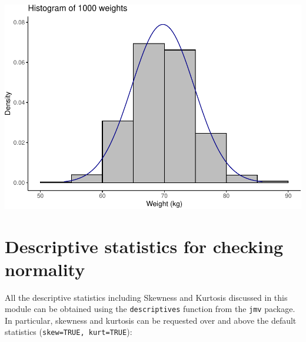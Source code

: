 \documentclass[
]{memoir}
\begin{document}
\includegraphics{02.1-Probability_files/figure-latex/unnamed-chunk-7-1.pdf}

\hypertarget{descriptive-statistics-for-checking-normality}{%
\section{Descriptive statistics for checking normality}\label{descriptive-statistics-for-checking-normality}}

All the descriptive statistics including Skewness and Kurtosis discussed in this module can be obtained using the \texttt{descriptives} function from the \texttt{jmv} package. In particular, skewness and kurtosis can be requested over and above the default statistics (\texttt{skew=TRUE,\ kurt=TRUE}):
\end{document}
